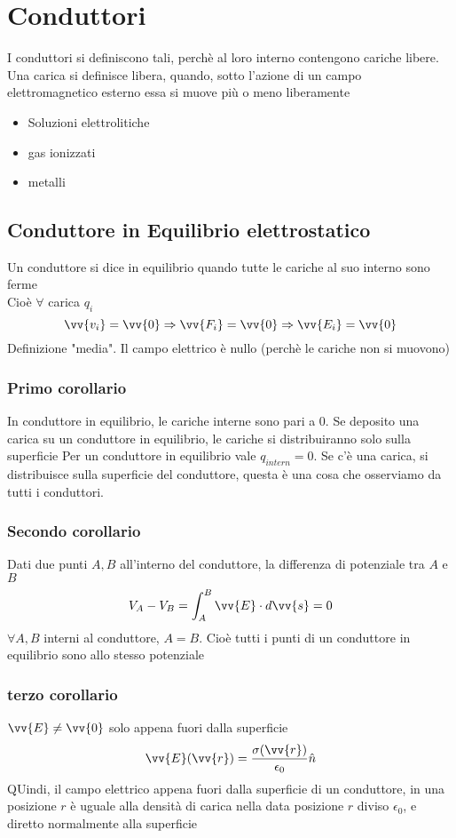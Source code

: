 \documentclass[a4paper]{report}
\begin{document}
  \section{Conduttori}
  I conduttori si definiscono tali, perchè al loro interno contengono cariche libere. Una carica si definisce libera, quando, sotto l'azione di un campo elettromagnetico esterno essa si muove più o meno liberamente
  \begin{itemize}
    \item Soluzioni elettrolitiche
      \item gas ionizzati
    \item metalli
  \end{itemize}

  \subsection{Conduttore in Equilibrio elettrostatico}
  Un conduttore si dice in equilibrio quando tutte le cariche al suo interno sono ferme\\
  Cioè $\forall$ carica $q_i$
  $$\vv{v_i} = \vv{0} \Rightarrow \vv{F_i} = \vv{0} \Rightarrow \vv{E_i} = \vv{0}$$
  Definizione "media". Il campo elettrico è nullo (perchè le cariche non si muovono)

  \subsubsection{Primo corollario}
  In conduttore in equilibrio, le cariche interne sono pari a $0$.
  Se deposito una carica su un conduttore in equilibrio, le cariche si distribuiranno solo sulla superficie
  Per un conduttore in equilibrio vale $q_{intern} =0$. Se c'è una carica, si distribuisce sulla superficie del conduttore, questa è una cosa che osserviamo da tutti i conduttori.
  \subsubsection{Secondo corollario}
  Dati due punti $A, B$ all'interno del conduttore, la differenza di potenziale tra $A$ e $B$
  $$V_A - V_B = \int_A^B \vv{E}\cdot d\vv{s}=0 $$
  $\forall A,B$ interni al conduttore, $A=B$. Cioè tutti i punti di un conduttore in equilibrio sono allo stesso potenziale
  \subsubsection{terzo corollario}
  \( \vv{E} \neq \vv{0} \) solo appena fuori dalla superficie
  $$ \vv{E}(\vv{r}) = \frac{\sigma(\vv{r})}{\epsilon_0} \hat{n} $$
  QUindi, il campo elettrico appena fuori dalla superficie di un conduttore, in una posizione $r$ è uguale alla densità di carica nella data posizione $r$ diviso $\epsilon_0$, e diretto normalmente alla superficie
\end{document}
